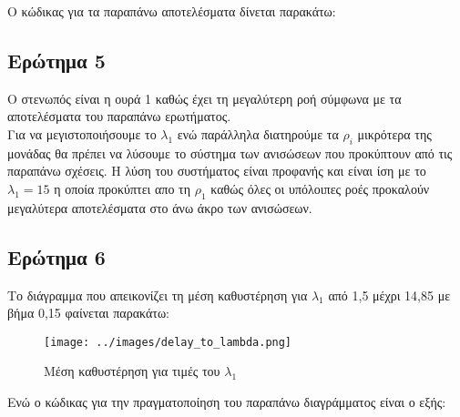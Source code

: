 \documentclass[12pt]{article}
\begin{document}
\pagebreak

Ο κώδικας για τα παραπάνω αποτελέσματα δίνεται παρακάτω:


\subsection{Ερώτημα 5}

Ο στενωπός είναι η ουρά 1 καθώς έχει τη μεγαλύτερη ροή σύμφωνα με τα αποτελέσματα του 
παραπάνω ερωτήματος.
\\

Για να μεγιστοποιήσουμε το $\lambda_1$ ενώ παράλληλα διατηρούμε τα $\rho_i$ μικρότερα της μονάδας
θα πρέπει να λύσουμε το σύστημα των ανισώσεων που προκύπτουν από τις παραπάνω σχέσεις.
Η λύση του συστήματος είναι προφανής και είναι ίση με το $\lambda_1 = 15$ η οποία προκύπτει 
απο τη $\rho_1$ καθώς όλες οι υπόλοιπες ροές προκαλούν μεγαλύτερα αποτελέσματα στο άνω άκρο 
των ανισώσεων.

\subsection{Ερώτημα 6}
Το διάγραμμα που απεικονίζει τη μέση καθυστέρηση για $\lambda_1$ από 1,5 μέχρι 14,85 με βήμα 0,15 
φαίνεται παρακάτω: 
\begin{figure}[H]
    \centering
    \texttt{[image: ../images/delay\_to\_lambda.png]}
    \caption{Μέση καθυστέρηση για τιμές του $\lambda_1$}
\end{figure}

Ενώ ο κώδικας για την πραγματοποίηση του παραπάνω διαγράμματος είναι ο εξής:


    
\end{document}
